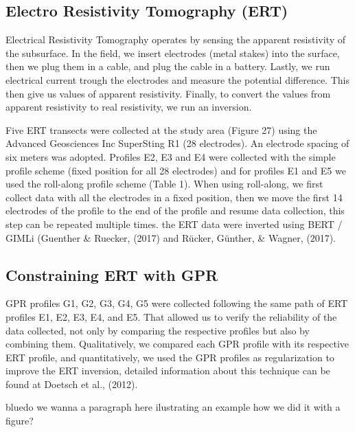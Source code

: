 \documentclass[5p]{elsarticle}
\newcommand{\COMON}{\begin{color}{blue}}
\newcommand{\COMOFF}{\end{color}}
\begin{document}
												
												
		\subsection{Electro Resistivity Tomography (ERT)}

Electrical Resistivity Tomography operates by sensing the apparent resistivity of the subsurface. In the field, we insert electrodes (metal stakes) into the surface, then we plug them in a cable, and plug the cable in a battery. Lastly, we run electrical current trough the electrodes and measure the potential difference. This then give us values of apparent resistivity. Finally, to convert the values from apparent resistivity to real resistivity, we run an inversion.

Five ERT transects were collected at the study area (Figure 27) using the Advanced Geosciences Inc SuperSting R1 (28 electrodes). An electrode spacing of six meters was adopted. Profiles E2, E3 and E4 were collected with the simple profile scheme (fixed position for all 28 electrodes) and for profiles E1 and E5 we used the roll-along profile scheme (Table 1). When using roll-along, we first collect data with all the electrodes in a fixed position, then we move the first 14 electrodes of the profile to the end of the profile and resume data collection, this step can be repeated multiple times.
the ERT data were inverted using BERT / GIMLi (Guenther \& Ruecker, (2017) and R\"ucker, G\"unther, \& Wagner, (2017).

	
	\subsection{Constraining ERT with GPR}
										
GPR profiles G1, G2, G3, G4, G5 were collected following the same path of ERT profiles E1, E2, E3, E4, and E5. That allowed us to verify the reliability of the data collected, not only by comparing the respective profiles but also by combining them. Qualitatively, we compared each GPR profile with its respective ERT profile, and quantitatively, we used the GPR profiles as regularization to improve the ERT inversion, detailed information about this technique can be found at Doetsch et al., (2012).

\COMON do we wanna a paragraph here ilustrating an example how we did it with a figure?\COMOFF
									
									
									
									
									
\end{document}

